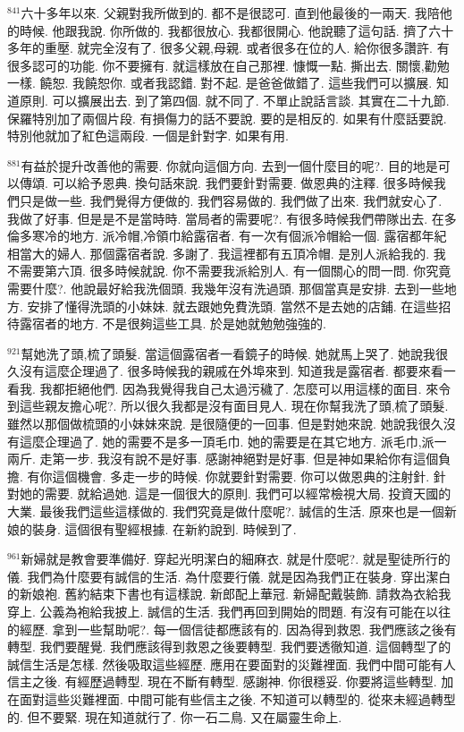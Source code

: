 \documentclass{book}
\begin{document}
$^{841}$六十多年以來.
父親對我所做到的.
都不是很認可.
直到他最後的一兩天.
我陪他的時候.
他跟我說.
你所做的.
我都很放心.
我都很開心.
他說聽了這句話.
擠了六十多年的重壓.
就完全沒有了.
很多父親,母親.
或者很多在位的人.
給你很多讚許.
有很多認可的功能.
你不要擁有.
就這樣放在自己那裡.
慷慨一點.
撕出去.
關懷,勸勉一樣.
饒恕.
我饒恕你.
或者我認錯.
對不起.
是爸爸做錯了.
這些我們可以擴展.
知道原則.
可以擴展出去.
到了第四個.
就不同了.
不單止說話言談.
其實在二十九節.
保羅特別加了兩個片段.
有損傷力的話不要說.
要的是相反的.
如果有什麼話要說.
特別他就加了紅色這兩段.
一個是針對字.
如果有用.

$^{881}$有益於提升改善他的需要.
你就向這個方向.
去到一個什麼目的呢?.
目的地是可以傳頌.
可以給予恩典.
換句話來說.
我們要針對需要.
做恩典的注釋.
很多時候我們只是做一些.
我們覺得方便做的.
我們容易做的.
我們做了出來.
我們就安心了.
我做了好事.
但是是不是當時時.
當局者的需要呢?.
有很多時候我們帶隊出去.
在多倫多寒冷的地方.
派冷帽,冷領巾給露宿者.
有一次有個派冷帽給一個.
露宿都年紀相當大的婦人.
那個露宿者說.
多謝了.
我這裡都有五頂冷帽.
是別人派給我的.
我不需要第六頂.
很多時候就說.
你不需要我派給別人.
有一個關心的問一問.
你究竟需要什麼?.
他說最好給我洗個頭.
我幾年沒有洗過頭.
那個當真是安排.
去到一些地方.
安排了懂得洗頭的小妹妹.
就去跟她免費洗頭.
當然不是去她的店鋪.
在這些招待露宿者的地方.
不是很夠這些工具.
於是她就勉勉強強的.

$^{921}$幫她洗了頭,梳了頭髮.
當這個露宿者一看鏡子的時候.
她就馬上哭了.
她說我很久沒有這麼企理過了.
很多時候我的親戚在外埠來到.
知道我是露宿者.
都要來看一看我.
我都拒絕他們.
因為我覺得我自己太過污穢了.
怎麼可以用這樣的面目.
來令到這些親友擔心呢?.
所以很久我都是沒有面目見人.
現在你幫我洗了頭,梳了頭髮.
雖然以那個做梳頭的小妹妹來說.
是很隨便的一回事.
但是對她來說.
她說我很久沒有這麼企理過了.
她的需要不是多一頂毛巾.
她的需要是在其它地方.
派毛巾,派一兩斤.
走第一步.
我沒有說不是好事.
感謝神絕對是好事.
但是神如果給你有這個負擔.
有你這個機會.
多走一步的時候.
你就要針對需要.
你可以做恩典的注射針.
針對她的需要.
就給過她.
這是一個很大的原則.
我們可以經常檢視大局.
投資天國的大業.
最後我們這些這樣做的.
我們究竟是做什麼呢?.
誠信的生活.
原來也是一個新娘的裝身.
這個很有聖經根據.
在新約說到.
時候到了.

$^{961}$新婦就是教會要準備好.
穿起光明潔白的細麻衣.
就是什麼呢?.
就是聖徒所行的儀.
我們為什麼要有誠信的生活.
為什麼要行儀.
就是因為我們正在裝身.
穿出潔白的新娘袍.
舊約結束下書也有這樣說.
新郎配上華冠.
新婦配戴裝飾.
請救為衣給我穿上.
公義為袍給我披上.
誠信的生活.
我們再回到開始的問題.
有沒有可能在以往的經歷.
拿到一些幫助呢?.
每一個信徒都應該有的.
因為得到救恩.
我們應該之後有轉型.
我們要醒覺.
我們應該得到救恩之後要轉型.
我們要透徹知道.
這個轉型了的誠信生活是怎樣.
然後吸取這些經歷.
應用在要面對的災難裡面.
我們中間可能有人信主之後.
有經歷過轉型.
現在不斷有轉型.
感謝神.
你很穩妥.
你要將這些轉型.
加在面對這些災難裡面.
中間可能有些信主之後.
不知道可以轉型的.
從來未經過轉型的.
但不要緊.
現在知道就行了.
你一石二鳥.
又在屬靈生命上.
\end{document}
